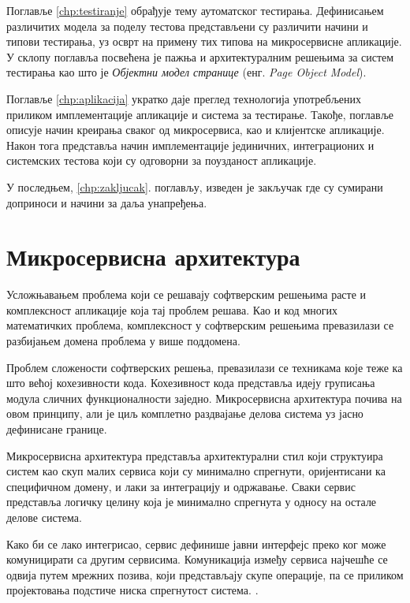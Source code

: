 \documentclass[12pt,oneside]{memoir}
\begin{document}
Поглавље \ref{chp:testiranje} обрађује тему аутоматског тестирања. Дефинисањем различитих модела за поделу тестова представљени су различити начини и типови тестирања, уз осврт на примену тих типова на микросервисне апликације. У склопу поглавља посвећена је пажња и архитектуралним решењима за систем тестирања као што је \textit{Објектни модел странице} (енг. \textit{Page Object Model}).

Поглавље \ref{chp:aplikacija} укратко даје преглед технологија употребљених приликом имплементације апликације и система за тестирање. Такође, поглавље описује начин креирања сваког од микросервиса, као и клијентске апликације. Након тога представља начин имплементације јединичних, интеграционих и системских тестова који су одговорни за поузданост апликације.

 У последњем, \ref{chp:zakljucak}. поглављу, изведен је закључак где су сумирани доприноси и начини за даља унапређења.



\chapter{Микросервисна архитектура}
\label{chp:mikroservisi}

Усложњавањем проблема који се решавају софтверским решењима расте и комплексност апликације која тај проблем решава. Као и код многих математичких проблема, комплексност у софтверским решењима превазилази се разбијањем домена проблема у више поддомена. 

Проблем сложености софтверских решења, превазилази се техникама које теже ка што већој кохезивности кода. Кохезивност кода представља идеју груписања модула сличних функционалности заједно. Микросервисна архитектура почива на овом принципу, али је циљ комплетно раздвајање делова система уз јасно дефинисане границе. 

Микросервисна архитектура представља архитектурални стил који структуира систем као скуп малих сервиса који су минимално спрегнути, оријентисани ка специфичном домену, и лаки за интеграцију и одржавање. Сваки сервис представља логичку целину која је минимално спрегнута у односу на остале делове система.

Како би се лако интегрисао, сервис дефинише јавни интерфејс преко ког може комуницирати са другим сервисима. Комуникација између сервиса најчешће се одвија путем мрежних позива, који представљају скупе операције, па се приликом пројектовања подстиче ниска спрегнутост система. \cite{microservicesBook}.
\end{document}
